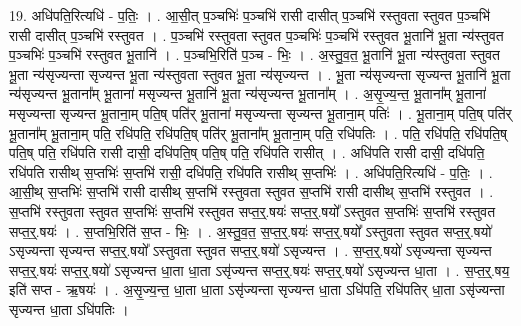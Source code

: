 \documentclass[17pt]{extarticle}
\begin{document}
19. अधि॑पति॒रित्यधि॑ - प॒तिः॒ । . आ॒सी॒त् प॒ञ्चभिः॑ प॒ञ्चभि॑ रासी दासीत् प॒ञ्चभि॑ रस्तुवता स्तुवत प॒ञ्चभि॑ रासी दासीत् प॒ञ्चभि॑ रस्तुवत । . प॒ञ्चभि॑ रस्तुवता स्तुवत प॒ञ्चभिः॑ प॒ञ्चभि॑ रस्तुवत भू॒तानि॑ भू॒ता न्य॑स्तुवत प॒ञ्चभिः॑ प॒ञ्चभि॑ रस्तुवत भू॒तानि॑ । . प॒ञ्चभि॒रिति॑ प॒ञ्च - भिः॒ । . अ॒स्तु॒व॒त॒ भू॒तानि॑ भू॒ता न्य॑स्तुवता स्तुवत भू॒ता न्य॑सृज्यन्ता सृज्यन्त भू॒ता न्य॑स्तुवता स्तुवत 
भू॒ता न्य॑सृज्यन्त । . भू॒ता न्य॑सृज्यन्ता सृज्यन्त भू॒तानि॑ भू॒ता न्य॑सृज्यन्त भू॒ताना᳚म् भू॒ताना॑ मसृज्यन्त भू॒तानि॑ 
भू॒ता न्य॑सृज्यन्त भू॒ताना᳚म् । . अ॒सृ॒ज्य॒न्त॒ भू॒ताना᳚म् भू॒ताना॑ मसृज्यन्ता सृज्यन्त भू॒ताना॒म् पति॒ष् पति॑र् भू॒ताना॑ मसृज्यन्ता सृज्यन्त भू॒ताना॒म् पतिः॑ । . भू॒ताना॒म् पति॒ष् पति॑र् भू॒ताना᳚म् भू॒ताना॒म् पति॒ रधि॑पति॒ रधि॑पति॒ष् पति॑र् भू॒ताना᳚म् भू॒ताना॒म् पति॒ रधि॑पतिः । . पति॒ रधि॑पति॒ रधि॑पति॒ष् पति॒ष् पति॒ रधि॑पति रासी दासी॒ दधि॑पति॒ष् पति॒ष् पति॒ रधि॑पति रासीत् । . अधि॑पति रासी दासी॒ दधि॑पति॒ रधि॑पति रासीथ् स॒प्तभिः॑ स॒प्तभि॑ रासी॒ दधि॑पति॒ रधि॑पति रासीथ् स॒प्तभिः॑ । . अधि॑पति॒रित्यधि॑ - प॒तिः॒ । . आ॒सी॒थ् स॒प्तभिः॑ स॒प्तभि॑ रासी दासीथ् स॒प्तभि॑ रस्तुवता स्तुवत स॒प्तभि॑ रासी दासीथ् स॒प्तभि॑ रस्तुवत । . स॒प्तभि॑ रस्तुवता स्तुवत स॒प्तभिः॑ स॒प्तभि॑ रस्तुवत सप्त॒र्॒.षयः॑ सप्त॒र्॒.षयो᳚ ऽस्तुवत स॒प्तभिः॑ स॒प्तभि॑ रस्तुवत सप्त॒र्॒.षयः॑ । . स॒प्तभि॒रिति॑ स॒प्त - भिः॒ । . अ॒स्तु॒व॒त॒ स॒प्त॒र्॒.षयः॑ सप्त॒र्॒.षयो᳚ ऽस्तुवता स्तुवत सप्त॒र्॒.षयो॑ ऽसृज्यन्ता सृज्यन्त सप्त॒र्॒.षयो᳚ ऽस्तुवता स्तुवत सप्त॒र्॒.षयो॑ ऽसृज्यन्त । . स॒प्त॒र्॒.षयो॑ ऽसृज्यन्ता सृज्यन्त सप्त॒र्॒.षयः॑ सप्त॒र्॒.षयो॑ ऽसृज्यन्त धा॒ता धा॒ता ऽसृ॑ज्यन्त सप्त॒र्॒.षयः॑ सप्त॒र्॒.षयो॑ ऽसृज्यन्त धा॒ता । . स॒प्त॒र्॒.षय॒ इति॑ सप्त - ऋ॒षयः॑ । . अ॒सृ॒ज्य॒न्त॒ धा॒ता धा॒ता ऽसृ॑ज्यन्ता सृज्यन्त धा॒ता ऽधि॑पति॒ रधि॑पतिर् धा॒ता ऽसृ॑ज्यन्ता सृज्यन्त धा॒ता ऽधि॑पतिः । \newline
\end{document}

